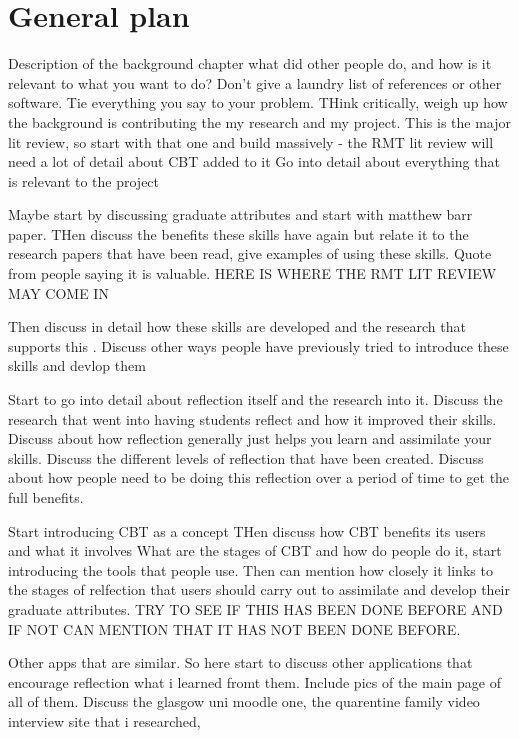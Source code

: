 \documentclass{l4proj}
\begin{document}
\section{General plan}

Description of the background chapter
what did other people do, and how is it relevant to what you want to do?
Don't give a laundry list of references or other software. Tie everything you say to your problem.
THink critically, weigh up how the background is contributing the my research and my project.
This is the major lit review, so start with that one and build massively - the RMT lit review will need a lot of detail about CBT added to it
Go into detail about everything that is relevant to the project
\par 
Maybe start by discussing graduate attributes and start with matthew barr paper. 
THen discuss the benefits these skills have again but relate it to the research papers that have been 
read, give examples of using these skills. Quote from people saying it is valuable.
HERE IS WHERE THE RMT LIT REVIEW MAY COME IN
\par 
Then discuss in detail how these skills are developed and the research that supports this .
Discuss other ways people have previously tried to introduce these skills and devlop them 
\par 
Start to go into detail about reflection itself and the research into it.
Discuss the research that went into having students reflect and how it improved their skills. Discuss about
how reflection generally just helps you learn and assimilate your skills. 
Discuss the different levels of reflection that have been created.
Discuss about how people need to be doing this reflection over a period of time to get the full benefits.
\par 
Start introducing CBT as a concept
THen discuss how CBT benefits its users and what it involves
What are the stages of CBT and how do people do it, start introducing the tools that people use.
Then can mention how closely it links to the stages of relfection that users should carry out to 
assimilate and develop their graduate attributes. 
TRY TO SEE IF THIS HAS BEEN DONE BEFORE AND IF NOT CAN MENTION THAT IT HAS NOT BEEN DONE BEFORE. 
\par 
Other apps that are similar. So here start to discuss other applications that encourage reflection 
what i learned fromt them.
Include pics of the main page of all of them.
Discuss the glasgow uni moodle one, the quarentine family video interview site that i researched,
\end{document}
